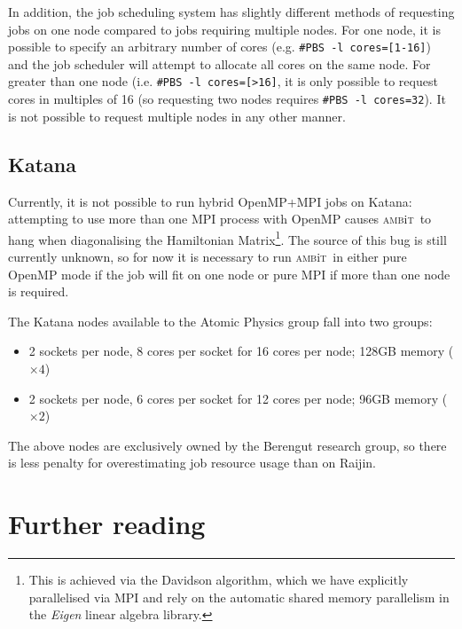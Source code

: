 \documentclass{report}
\newcommand{\ambit}{\textsc{amb}{\footnotesize i}\textsc{t}}
\begin{document}
In addition, the job scheduling system has slightly different methods of requesting jobs on one node 
compared to jobs requiring multiple nodes. For one node, it is possible to specify an arbitrary number of
cores (e.g. \texttt{\#PBS -l cores=[1-16]}) and the job scheduler will attempt to allocate all cores on 
the same node. For greater than one node (i.e. \texttt{\#PBS -l cores=[>16]}, it is only possible to 
request cores in multiples of 16 (so requesting two nodes requires \texttt{\#PBS -l cores=32}). It is 
not possible to request multiple nodes in any other manner.

\subsection{Katana}

Currently, it is not possible to run hybrid OpenMP+MPI jobs on Katana: attempting to use more than one
MPI process with OpenMP causes \ambit\ to hang when diagonalising the Hamiltonian Matrix\footnote{This is
achieved via the Davidson algorithm, which we have explicitly parallelised via MPI and rely on the
automatic shared memory parallelism in the \textit{Eigen} linear algebra library.}. The source of this
bug is still currently unknown, so for now it is necessary to run \ambit\ in either pure OpenMP mode if
the job will fit on one node or pure MPI if more than one node is required.

The Katana nodes available to the Atomic Physics group fall into two groups:

\begin{itemize}
\item 2 sockets per node, 8 cores per socket for 16 cores per node; 128GB memory ($\times 4$)
\item 2 sockets per node, 6 cores per socket for 12 cores per node; 96GB memory ($\times 2$)
\end{itemize}

The above nodes are exclusively owned by the Berengut research group, so there is less penalty for
overestimating job resource usage than on Raijin.

\section{Further reading}
\end{document}

